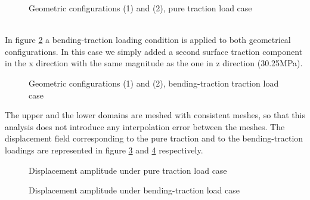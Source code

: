  \begin{figure}[!ht]
 \centering
      \caption{Geometric configurations (1) and (2), pure traction load case }
      \label{fig.13}
    \end{figure}
 \\
 In figure \ref{fig.14} a bending-traction loading condition is applied to both geometrical configurations. In this case we simply added a second surface traction component in the x direction with the same magnitude as the one in z direction (30.25MPa).
 \begin{figure}[!ht]
 \centering
      \caption{Geometric configurations (1) and (2), bending-traction traction load case }
      \label{fig.14}
    \end{figure}
 The upper and the lower domains are meshed with consistent meshes, so that this analysis does not introduce any interpolation error between the meshes. The displacement field corresponding to the pure traction and to the bending-traction loadings are represented in figure \ref{fig.15} and \ref{fig.16} respectively.
 \\
    \begin{figure}[!ht]
    \centering
      \caption{Displacement amplitude under pure traction load case }
      \label{fig.15}
    \end{figure}
    \begin{figure}[!ht]
    \centering
      \caption{Displacement amplitude under bending-traction load case }
      \label{fig.16}
    \end{figure}
